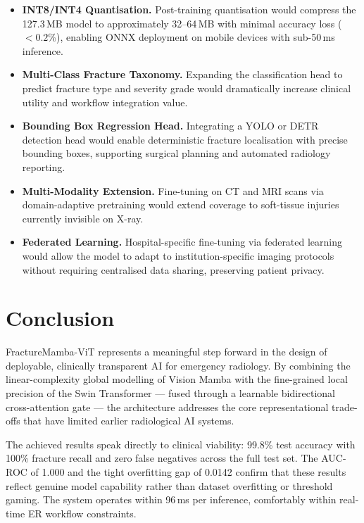 \documentclass[12pt, a4paper]{article}
\begin{document}
\begin{itemize}

  \item \textbf{INT8/INT4 Quantisation.}
  Post-training quantisation would compress the 127.3\,MB model to approximately 32--64\,MB
  with minimal accuracy loss ($<0.2$\%), enabling ONNX deployment on mobile devices with
  sub-50\,ms inference.

  \item \textbf{Multi-Class Fracture Taxonomy.}
  Expanding the classification head to predict fracture type and severity grade would
  dramatically increase clinical utility and workflow integration value.

  \item \textbf{Bounding Box Regression Head.}
  Integrating a YOLO or DETR detection head would enable deterministic fracture localisation
  with precise bounding boxes, supporting surgical planning and automated radiology reporting.

  \item \textbf{Multi-Modality Extension.}
  Fine-tuning on CT and MRI scans via domain-adaptive pretraining would extend coverage to
  soft-tissue injuries currently invisible on X-ray.

  \item \textbf{Federated Learning.}
  Hospital-specific fine-tuning via federated learning would allow the model to adapt to
  institution-specific imaging protocols without requiring centralised data sharing,
  preserving patient privacy.

\end{itemize}

\section{Conclusion}

FractureMamba-ViT represents a meaningful step forward in the design of deployable, clinically
transparent AI for emergency radiology. By combining the linear-complexity global modelling of
Vision Mamba with the fine-grained local precision of the Swin Transformer — fused through a
learnable bidirectional cross-attention gate — the architecture addresses the core
representational trade-offs that have limited earlier radiological AI systems.

The achieved results speak directly to clinical viability: 99.8\% test accuracy with 100\%
fracture recall and zero false negatives across the full test set. The AUC-ROC of 1.000 and the
tight overfitting gap of 0.0142 confirm that these results reflect genuine model capability
rather than dataset overfitting or threshold gaming. The system operates within 96\,ms per
inference, comfortably within real-time ER workflow constraints.
\end{document}
